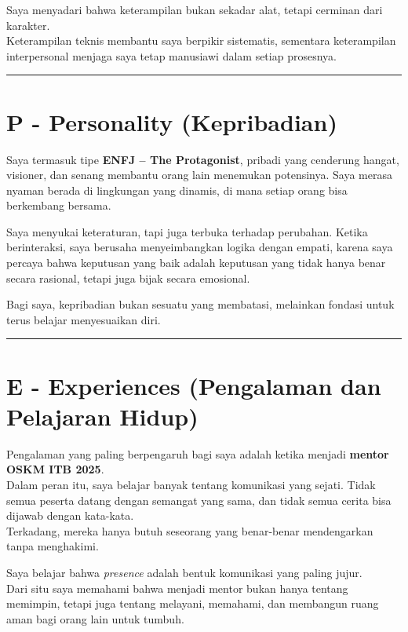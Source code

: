 \documentclass[
  letterpaper,
  DIV=11,
  numbers=noendperiod]{scrreprt}
\begin{document}
Saya menyadari bahwa keterampilan bukan sekadar alat, tetapi cerminan
dari karakter.\\
Keterampilan teknis membantu saya berpikir sistematis, sementara
keterampilan interpersonal menjaga saya tetap manusiawi dalam setiap
prosesnya.

\begin{center}\rule{0.5\linewidth}{0.5pt}\end{center}

\section{P - Personality
(Kepribadian)}\label{p---personality-kepribadian}

Saya termasuk tipe \textbf{ENFJ -- The Protagonist}, pribadi yang
cenderung hangat, visioner, dan senang membantu orang lain menemukan
potensinya. Saya merasa nyaman berada di lingkungan yang dinamis, di
mana setiap orang bisa berkembang bersama.

Saya menyukai keteraturan, tapi juga terbuka terhadap perubahan. Ketika
berinteraksi, saya berusaha menyeimbangkan logika dengan empati, karena
saya percaya bahwa keputusan yang baik adalah keputusan yang tidak hanya
benar secara rasional, tetapi juga bijak secara emosional.

Bagi saya, kepribadian bukan sesuatu yang membatasi, melainkan fondasi
untuk terus belajar menyesuaikan diri.

\begin{center}\rule{0.5\linewidth}{0.5pt}\end{center}

\section{E - Experiences (Pengalaman dan Pelajaran
Hidup)}\label{e---experiences-pengalaman-dan-pelajaran-hidup}

Pengalaman yang paling berpengaruh bagi saya adalah ketika menjadi
\textbf{mentor OSKM ITB 2025}.\\
Dalam peran itu, saya belajar banyak tentang komunikasi yang sejati.
Tidak semua peserta datang dengan semangat yang sama, dan tidak semua
cerita bisa dijawab dengan kata-kata.\\
Terkadang, mereka hanya butuh seseorang yang benar-benar mendengarkan
tanpa menghakimi.

Saya belajar bahwa \emph{presence} adalah bentuk komunikasi yang paling
jujur.\\
Dari situ saya memahami bahwa menjadi mentor bukan hanya tentang
memimpin, tetapi juga tentang melayani, memahami, dan membangun ruang
aman bagi orang lain untuk tumbuh.
\end{document}
